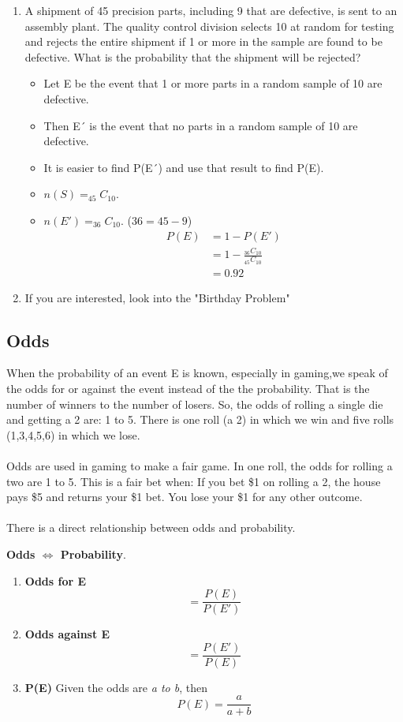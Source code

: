 \documentclass[14pt]{extarticle}
\begin{document}
\begin{enumerate}
	\item A shipment of 45 precision parts, including 9 that are defective, is sent to an assembly plant. The quality control division selects 10 at random for testing and rejects the entire shipment if 1 or more in the sample are found to be defective.
	What is the probability that the shipment will be rejected?
	\begin{itemize}
		\item Let E be the event that 1 or more parts in a random sample of 10 are defective.	
		\item Then E´ is the event that no parts in a random sample of 10 are defective.
		\item It is easier to find P(E´) and use that result to find P(E).
		\item $n(S) = _{45}C_{10}$.
		\item $n(E') = _{36}C_{10}$. ($36 = 45-9$)
		\begin{align*}
			P(E) &=1 - P(E') \\
			&= 1 - \frac{_{36}C_{10}}{_{45}C_{10}} \\
			& = 0.92
		\end{align*}
	\end{itemize}

	\item If you are interested, look into the "Birthday Problem"
\end{enumerate}

\subsection{Odds}
When the probability of an event E is known, especially in gaming,we speak of the odds for or against the event instead of the the probability. That is the number of winners to the number of losers. So, the odds of rolling a single die and getting a 2 are: 1 to 5. There is one roll (a 2) in which we win and five rolls (1,3,4,5,6) in which we lose.
\\\\
Odds are used in gaming to make a fair game. In one roll, the odds for rolling a two are 1 to 5. This is a fair bet when: If you bet \$1 on rolling a 2, the house pays \$5 and returns your \$1 bet. You lose your \$1 for any other outcome. 
\\\\
There is a direct relationship between odds and probability.
\begin{tcolorbox}[enhanced jigsaw,colback=bg,boxrule=0pt,arc=0pt] 
	\textbf{Odds $\Leftrightarrow $ Probability}.
	\begin{enumerate}
		\item \textbf{Odds for E} $$= \frac{P(E)}{P(E')}$$
		\item \textbf{Odds against E} $$= \frac{P(E')}{P(E)}$$
		\item \textbf{P(E)} Given the odds are \textit{a to b}, then $$P(E)= \frac{a}{a+b}$$
	\end{enumerate}
\end{tcolorbox}
\end{document}
